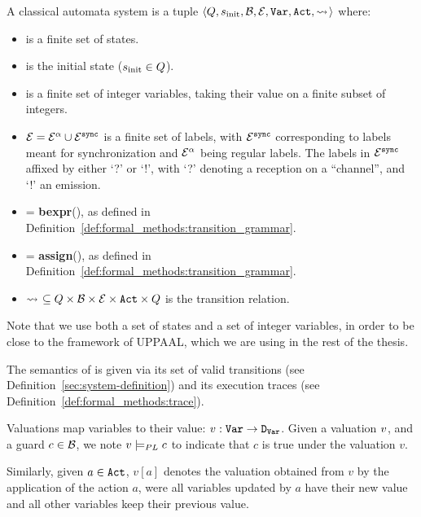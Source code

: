 \begin{definition}
A classical automata system \automatasystem{} is a tuple
$\langle Q{}, \allowbreak{}
s_{\text{init}}{}, \allowbreak{}
\mathcal{B}{}, \allowbreak{}
\mathcal{E}{}, \allowbreak{}
\text{\texttt{Var}}{}, \allowbreak{}
\text{\texttt{Act}}{}, \allowbreak{}
{\rightsquigarrow{}\!}{}\rangle$ where:
\begin{itemize}
\item \automatastates{} is a finite set of states.
\item \automatainit{} is the initial state ($s_{\text{init}}{} \in
Q{}$).
\item \automatavariables{} is a finite set of integer variables, taking their value on a finite subset \automatavardomain{} of integers.
\item
   $\mathcal{E}{} = \mathcal{E}{}^{\alpha} \cup
   \mathcal{E}{}^{\texttt{sync}}$ is a finite set of labels, with
   $\mathcal{E}{}^{\texttt{sync}}$ corresponding to labels meant for
   synchronization and $\mathcal{E}{}^{\alpha}$ being regular labels.
   The labels in $\mathcal{E}{}^{\texttt{sync}}$ affixed by either `?'
   or `!', with `?' denoting a reception on a ``channel'', and `!' an emission.
\item
   \automatacondlabels{} = \textbf{bexpr}(\automatavariables{}), as defined in
   Definition~\ref{def:formal_methods:transition_grammar}.
\item
   \automataactionlabels{} = \textbf{assign}(\automatavariables{}), as defined
   in Definition~\ref{def:formal_methods:transition_grammar}.
\item
   ${\rightsquigarrow{}\!}{} \subseteq
      Q{}
      \times \mathcal{B}{}
      \times \mathcal{E}{}
      \times \text{\texttt{Act}}{}
      \times Q{}
   $ is the transition relation.
 \end{itemize}
 Note that we use both a set \automatastates{} of
 states and a set \automatavariables{} of integer variables, in order
 to be close to the framework of UPPAAL, which we are using in the
 rest of the thesis.
 
The semantics of \automatasystem{} is given via its set of valid
transitions (see Definition~\ref{sec:system-definition}) and its
execution traces (see Definition~\ref{def:formal_methods:trace}).
\end{definition}

\begin{definition}[Valuation]
Valuations map variables to their value:
$v_{}:\text{\texttt{Var}}{} \to \text{\texttt{D}}_{\text{\texttt{Var}}}{}$.
Given a valuation $v_{}$, and a guard
$c \in \mathcal{B}{}$, we note $v_{} \models_{PL} c$
to indicate that $c$ is true under the valuation $v$.

Similarly, given $a \in \text{\texttt{Act}}{}$, $v[a]$ denotes the valuation
obtained from $v$ by the application of the action $a$, were all variables
updated by $a$ have their new value and all other variables keep their previous
value.
\end{definition}


